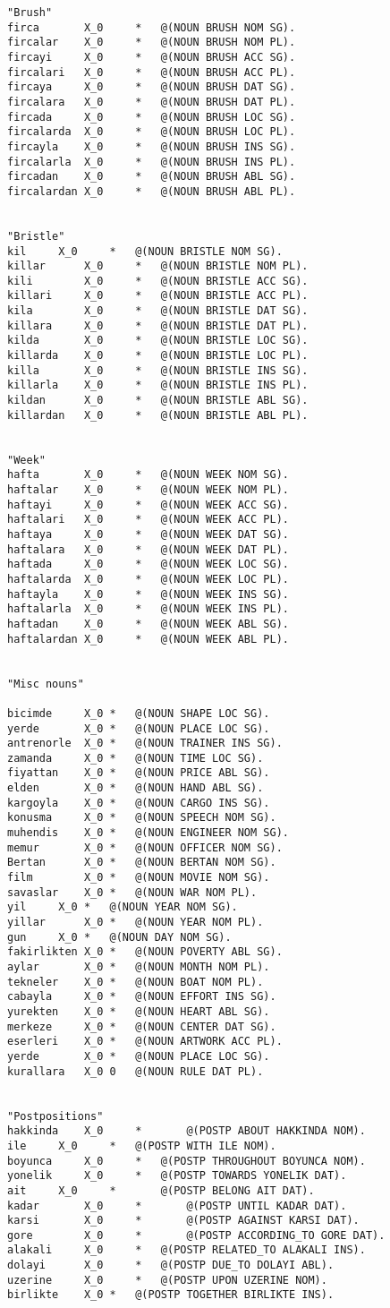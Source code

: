 \begin{lstlisting}
"Brush"
firca		X_0 	* 	@(NOUN BRUSH NOM SG).
fircalar	X_0 	* 	@(NOUN BRUSH NOM PL).
fircayi		X_0 	* 	@(NOUN BRUSH ACC SG).
fircalari 	X_0 	* 	@(NOUN BRUSH ACC PL).
fircaya		X_0 	* 	@(NOUN BRUSH DAT SG).
fircalara 	X_0 	* 	@(NOUN BRUSH DAT PL).
fircada		X_0 	* 	@(NOUN BRUSH LOC SG).
fircalarda	X_0 	* 	@(NOUN BRUSH LOC PL).
fircayla	X_0 	* 	@(NOUN BRUSH INS SG).
fircalarla	X_0 	* 	@(NOUN BRUSH INS PL).
fircadan	X_0 	* 	@(NOUN BRUSH ABL SG).
fircalardan	X_0 	* 	@(NOUN BRUSH ABL PL).


"Bristle"
kil		X_0 	* 	@(NOUN BRISTLE NOM SG).
killar		X_0 	* 	@(NOUN BRISTLE NOM PL).
kili		X_0 	* 	@(NOUN BRISTLE ACC SG).
killari 	X_0 	* 	@(NOUN BRISTLE ACC PL).
kila		X_0 	* 	@(NOUN BRISTLE DAT SG).
killara 	X_0 	* 	@(NOUN BRISTLE DAT PL).
kilda		X_0 	* 	@(NOUN BRISTLE LOC SG).
killarda	X_0 	* 	@(NOUN BRISTLE LOC PL).
killa		X_0 	* 	@(NOUN BRISTLE INS SG).
killarla	X_0 	* 	@(NOUN BRISTLE INS PL).
kildan		X_0 	* 	@(NOUN BRISTLE ABL SG).
killardan	X_0 	* 	@(NOUN BRISTLE ABL PL).


"Week"
hafta		X_0 	* 	@(NOUN WEEK NOM SG).
haftalar	X_0 	* 	@(NOUN WEEK NOM PL).
haftayi		X_0 	* 	@(NOUN WEEK ACC SG).
haftalari 	X_0 	* 	@(NOUN WEEK ACC PL).
haftaya		X_0 	* 	@(NOUN WEEK DAT SG).
haftalara 	X_0 	* 	@(NOUN WEEK DAT PL).
haftada		X_0 	* 	@(NOUN WEEK LOC SG).
haftalarda	X_0 	* 	@(NOUN WEEK LOC PL).
haftayla	X_0 	* 	@(NOUN WEEK INS SG).
haftalarla	X_0 	* 	@(NOUN WEEK INS PL).
haftadan	X_0 	* 	@(NOUN WEEK ABL SG).
haftalardan	X_0 	* 	@(NOUN WEEK ABL PL).


"Misc nouns"

bicimde		X_0	*	@(NOUN SHAPE LOC SG).
yerde		X_0	*	@(NOUN PLACE LOC SG).
antrenorle	X_0	*	@(NOUN TRAINER INS SG).
zamanda		X_0	*	@(NOUN TIME LOC SG).
fiyattan	X_0	*	@(NOUN PRICE ABL SG).
elden		X_0	*	@(NOUN HAND ABL SG).
kargoyla	X_0	*	@(NOUN CARGO INS SG).
konusma		X_0	*	@(NOUN SPEECH NOM SG).
muhendis	X_0	*	@(NOUN ENGINEER NOM SG).
memur		X_0	*	@(NOUN OFFICER NOM SG).
Bertan		X_0	*	@(NOUN BERTAN NOM SG).
film		X_0	*	@(NOUN MOVIE NOM SG).
savaslar	X_0	*	@(NOUN WAR NOM PL).
yil		X_0	*	@(NOUN YEAR NOM SG).
yillar		X_0	*	@(NOUN YEAR NOM PL).
gun		X_0	*	@(NOUN DAY NOM SG).
fakirlikten	X_0	*	@(NOUN POVERTY ABL SG).
aylar		X_0	*	@(NOUN MONTH NOM PL).
tekneler	X_0	*	@(NOUN BOAT NOM PL).
cabayla		X_0	*	@(NOUN EFFORT INS SG).
yurekten	X_0	*	@(NOUN HEART ABL SG).
merkeze		X_0	*	@(NOUN CENTER DAT SG).
eserleri	X_0	*	@(NOUN ARTWORK ACC PL).
yerde		X_0	*	@(NOUN PLACE LOC SG).
kurallara	X_0	0	@(NOUN RULE DAT PL).


"Postpositions"
hakkinda 	X_0 	*    	@(POSTP ABOUT HAKKINDA NOM).		  		   		  
ile	 	X_0 	*	@(POSTP WITH ILE NOM).
boyunca  	X_0 	*	@(POSTP THROUGHOUT BOYUNCA NOM).
yonelik  	X_0 	*	@(POSTP TOWARDS YONELIK DAT).
ait	 	X_0 	*    	@(POSTP BELONG AIT DAT).
kadar	 	X_0 	*    	@(POSTP UNTIL KADAR DAT).
karsi	 	X_0 	*    	@(POSTP AGAINST KARSI DAT).
gore	 	X_0 	*    	@(POSTP ACCORDING_TO GORE DAT).
alakali		X_0 	*	@(POSTP RELATED_TO ALAKALI INS).
dolayi		X_0 	*	@(POSTP DUE_TO DOLAYI ABL).
uzerine		X_0 	*	@(POSTP UPON UZERINE NOM).
birlikte	X_0	*	@(POSTP TOGETHER BIRLIKTE INS).	



\end{lstlisting}
